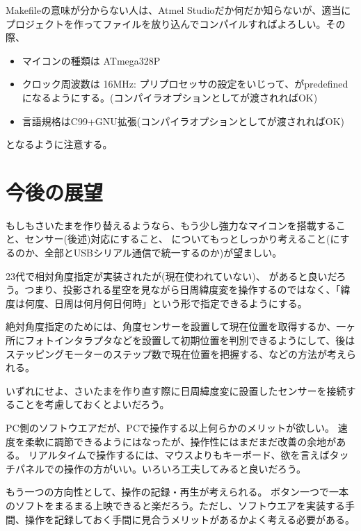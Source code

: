 \documentclass[letterpaper,10pt,dvipdfmx]{sphinxmanual}
\begin{document}
Makefileの意味が分からない人は、Atmel Studioだか何だか知らないが、適当にプロジェクトを作ってファイルを放り込んでコンパイルすればよろしい。その際、
\begin{itemize}
\item {} 
マイコンの種類は ATmega328P

\item {} 
クロック周波数は 16MHz: プリプロセッサの設定をいじって、がpredefinedになるようにする。(コンパイラオプションとしてが渡されればOK)

\item {} 
言語規格はC99+GNU拡張(コンパイラオプションとしてが渡されればOK)

\end{itemize}

となるように注意する。


\section{今後の展望}
\label{\detokenize{nissyu-idohen/saitama:}}\label{\detokenize{nissyu-idohen/saitama:id8}}
もしもさいたまを作り替えるようなら、もう少し強力なマイコンを搭載すること、センサー(後述)対応にすること、 についてもっとしっかり考えること(にするのか、全部とUSBシリアル通信で統一するのか)が望ましい。

23代で相対角度指定が実装されたが(現在使われていない)、 があると良いだろう。つまり、投影される星空を見ながら日周緯度変を操作するのではなく、「緯度は何度、日周は何月何日何時」という形で指定できるようにする。

絶対角度指定のためには、角度センサーを設置して現在位置を取得するか、一ヶ所にフォトインタラプタなどを設置して初期位置を判別できるようにして、後はステッピングモーターのステップ数で現在位置を把握する、などの方法が考えられる。

いずれにせよ、さいたまを作り直す際に日周緯度変に設置したセンサーを接続することを考慮しておくとよいだろう。

PC側のソフトウエアだが、PCで操作する以上何らかのメリットが欲しい。
速度を柔軟に調節できるようにはなったが、操作性にはまだまだ改善の余地がある。
リアルタイムで操作するには、マウスよりもキーボード、欲を言えばタッチパネルでの操作の方がいい。いろいろ工夫してみると良いだろう。

もう一つの方向性として、操作の記録・再生が考えられる。
ボタン一つで一本のソフトをまるまる上映できると楽だろう。ただし、ソフトウエアを実装する手間、操作を記録しておく手間に見合うメリットがあるかよく考える必要がある。
\end{document}
